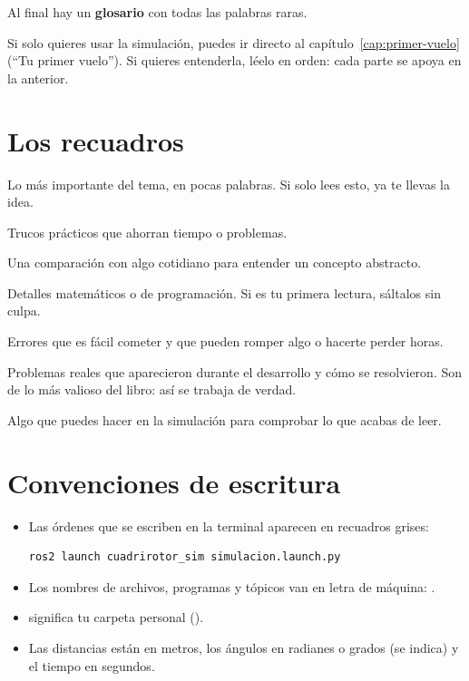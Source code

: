 Al final hay un \textbf{glosario} con todas las palabras raras.

Si solo quieres usar la simulación, puedes ir directo al capítulo~\ref{cap:primer-vuelo}
(``Tu primer vuelo''). Si quieres entenderla, léelo en orden: cada parte se apoya en la anterior.

\section*{Los recuadros}

\begin{recuerda}
Lo más importante del tema, en pocas palabras. Si solo lees esto, ya te llevas la idea.
\end{recuerda}

\begin{consejo}
Trucos prácticos que ahorran tiempo o problemas.
\end{consejo}

\begin{ejemplo}
Una comparación con algo cotidiano para entender un concepto abstracto.
\end{ejemplo}

\begin{tecnico}
Detalles matemáticos o de programación. Si es tu primera lectura, sáltalos sin culpa.
\end{tecnico}

\begin{aviso}
Errores que es fácil cometer y que pueden romper algo o hacerte perder horas.
\end{aviso}

\begin{leccion}
Problemas reales que aparecieron durante el desarrollo y cómo se resolvieron. Son de lo más
valioso del libro: así se trabaja de verdad.
\end{leccion}

\begin{ejercicio}
Algo que puedes hacer en la simulación para comprobar lo que acabas de leer.
\end{ejercicio}

\section*{Convenciones de escritura}

\begin{itemize}
  \item Las órdenes que se escriben en la terminal aparecen en recuadros grises:
\begin{lstlisting}[style=bash]
ros2 launch cuadrirotor_sim simulacion.launch.py
\end{lstlisting}
  \item Los nombres de archivos, programas y tópicos van en letra de máquina: .
  \item \cod{~} significa tu carpeta personal ().
  \item Las distancias están en metros, los ángulos en radianes o grados (se indica) y el tiempo
        en segundos.
\end{itemize}
